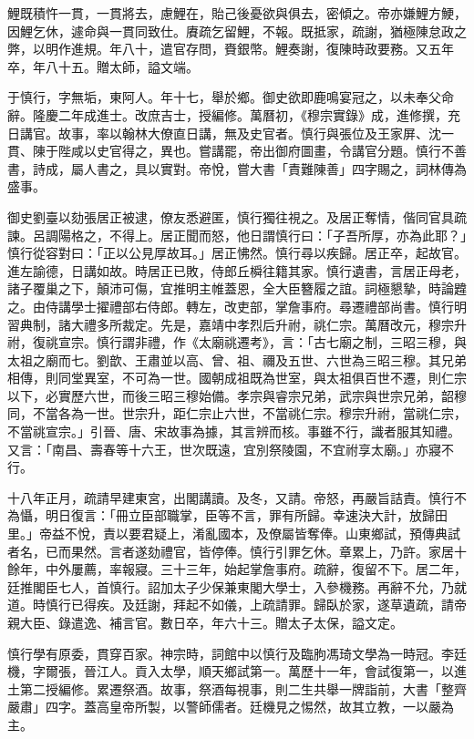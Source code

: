 \begin{pinyinscope}
鯉既積忤一貫，一貫將去，慮鯉在，貽己後憂欲與俱去，密傾之。帝亦嫌鯉方鯁，因鯉乞休，遽命與一貫同致仕。賡疏乞留鯉，不報。既抵家，疏謝，猶極陳怠政之弊，以明作進規。年八十，遣官存問，賚銀幣。鯉奏謝，復陳時政要務。又五年卒，年八十五。贈太師，謚文端。

于慎行，字無垢，東阿人。年十七，舉於鄉。御史欲即鹿鳴宴冠之，以未奉父命辭。隆慶二年成進士。改庶吉士，授編修。萬曆初，《穆宗實錄》成，進修撰，充日講官。故事，率以翰林大僚直日講，無及史官者。慎行與張位及王家屏、沈一貫、陳于陛咸以史官得之，異也。嘗講罷，帝出御府圖畫，令講官分題。慎行不善書，詩成，屬人書之，具以實對。帝悅，嘗大書「責難陳善」四字賜之，詞林傳為盛事。

御史劉臺以劾張居正被逮，僚友悉避匿，慎行獨往視之。及居正奪情，偕同官具疏諫。呂調陽格之，不得上。居正聞而怒，他日謂慎行曰：「子吾所厚，亦為此耶？」慎行從容對曰：「正以公見厚故耳。」居正怫然。慎行尋以疾歸。居正卒，起故官。進左諭德，日講如故。時居正已敗，侍郎丘橓往籍其家。慎行遺書，言居正母老，諸子覆巢之下，顛沛可傷，宜推明主帷蓋恩，全大臣簪履之誼。詞極懇摯，時論韙之。由侍講學士擢禮部右侍郎。轉左，改吏部，掌詹事府。尋遷禮部尚書。慎行明習典制，諸大禮多所裁定。先是，嘉靖中孝烈后升祔，祧仁宗。萬曆改元，穆宗升祔，復祧宣宗。慎行謂非禮，作《太廟祧遷考》，言：「古七廟之制，三昭三穆，與太祖之廟而七。劉歆、王肅並以高、曾、祖、禰及五世、六世為三昭三穆。其兄弟相傳，則同堂異室，不可為一世。國朝成祖既為世室，與太祖俱百世不遷，則仁宗以下，必實歷六世，而後三昭三穆始備。孝宗與睿宗兄弟，武宗與世宗兄弟，韶穆同，不當各為一世。世宗升，距仁宗止六世，不當祧仁宗。穆宗升祔，當祧仁宗，不當祧宣宗。」引晉、唐、宋故事為據，其言辨而核。事雖不行，識者服其知禮。又言：「南昌、壽春等十六王，世次既遠，宜別祭陵園，不宜祔享太廟。」亦寢不行。

十八年正月，疏請早建東宮，出閣講讀。及冬，又請。帝怒，再嚴旨詰責。慎行不為懾，明日復言：「冊立臣部職掌，臣等不言，罪有所歸。幸速決大計，放歸田里。」帝益不悅，責以要君疑上，淆亂國本，及僚屬皆奪俸。山東鄉試，預傳典試者名，已而果然。言者遂劾禮官，皆停俸。慎行引罪乞休。章累上，乃許。家居十餘年，中外屢薦，率報寢。三十三年，始起掌詹事府。疏辭，復留不下。居二年，廷推閣臣七人，首慎行。詔加太子少保兼東閣大學士，入參機務。再辭不允，乃就道。時慎行已得疾。及廷謝，拜起不如儀，上疏請罪。歸臥於家，遂草遺疏，請帝親大臣、錄遣逸、補言官。數日卒，年六十三。贈太子太保，謚文定。

慎行學有原委，貫穿百家。神宗時，詞館中以慎行及臨朐馮琦文學為一時冠。李廷機，字爾張，晉江人。貢入太學，順天鄉試第一。萬歷十一年，會試復第一，以進土第二授編修。累遷祭酒。故事，祭酒每視事，則二生共舉一牌詣前，大書「整齊嚴肅」四字。蓋高皇帝所製，以警師儒者。廷機見之惕然，故其立教，一以嚴為主。


\end{pinyinscope}
